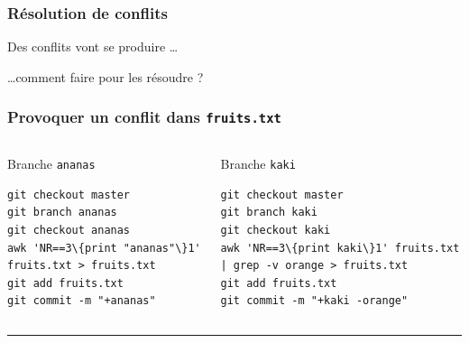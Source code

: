 \documentclass[table,tikz,12pt,svgnames]{beamer}
\begin{document}
\begin{frame}
\frametitle{Résolution de conflits}
\begin{block}{Des conflits vont se produire \ldots}
\end{block}
\begin{block}{\ldots comment faire pour les résoudre ?}
\end{block}
\end{frame}


\begin{frame}[fragile]
\frametitle{Provoquer un conflit dans \texttt{fruits.txt}}
\begin{adjustwidth}{-0.3cm}{-0.3cm}{}
\vspace{-0.2em}
\begin{columns}[T] %
	\begin{column}{.52\textwidth}
		\color{darkgreen}
		Branche \texttt{ananas}
		\color{black}
\begin{verbatim}
git checkout master
git branch ananas
git checkout ananas
awk 'NR==3\{print "ananas"\}1' fruits.txt > fruits.txt
git add fruits.txt
git commit -m "+ananas"
\end{verbatim}
	\end{column}%
	\hfill%
	\begin{column}{.52\textwidth}
		\vspace{-0.2em}
		\color{blue}%
		Branche \texttt{kaki}
		\color{black}
		\vspace{-0.3em}
\begin{verbatim}
git checkout master
git branch kaki
git checkout kaki
awk 'NR==3\{print kaki\}1' fruits.txt | grep -v orange > fruits.txt
git add fruits.txt
git commit -m "+kaki -orange"
\end{verbatim}
\end{column}%
\end{columns}
\end{adjustwidth}

\color{gray}\rule{\linewidth}{3pt}
\color{black}
\vspace{-0.82em}


\end{frame}
\end{document}
